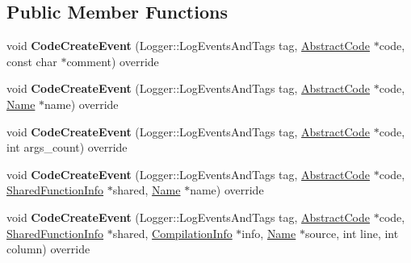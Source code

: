 \subsection*{Public Member Functions}
\begin{DoxyCompactItemize}
\item 
void {\bfseries Code\+Create\+Event} (Logger\+::\+Log\+Events\+And\+Tags tag, \hyperlink{classv8_1_1internal_1_1_abstract_code}{Abstract\+Code} $\ast$code, const char $\ast$comment) override\hypertarget{classv8_1_1internal_1_1_code_event_logger_ac6533a216b4c8f45126d80cec59da31d}{}\label{classv8_1_1internal_1_1_code_event_logger_ac6533a216b4c8f45126d80cec59da31d}

\item 
void {\bfseries Code\+Create\+Event} (Logger\+::\+Log\+Events\+And\+Tags tag, \hyperlink{classv8_1_1internal_1_1_abstract_code}{Abstract\+Code} $\ast$code, \hyperlink{classv8_1_1internal_1_1_name}{Name} $\ast$name) override\hypertarget{classv8_1_1internal_1_1_code_event_logger_a3d4a2166654c7a3b64dc141050dbea47}{}\label{classv8_1_1internal_1_1_code_event_logger_a3d4a2166654c7a3b64dc141050dbea47}

\item 
void {\bfseries Code\+Create\+Event} (Logger\+::\+Log\+Events\+And\+Tags tag, \hyperlink{classv8_1_1internal_1_1_abstract_code}{Abstract\+Code} $\ast$code, int args\+\_\+count) override\hypertarget{classv8_1_1internal_1_1_code_event_logger_a402ccb5bcf1add1d69130b81295366dc}{}\label{classv8_1_1internal_1_1_code_event_logger_a402ccb5bcf1add1d69130b81295366dc}

\item 
void {\bfseries Code\+Create\+Event} (Logger\+::\+Log\+Events\+And\+Tags tag, \hyperlink{classv8_1_1internal_1_1_abstract_code}{Abstract\+Code} $\ast$code, \hyperlink{classv8_1_1internal_1_1_shared_function_info}{Shared\+Function\+Info} $\ast$shared, \hyperlink{classv8_1_1internal_1_1_name}{Name} $\ast$name) override\hypertarget{classv8_1_1internal_1_1_code_event_logger_af70e028af8a6016e51fe1c5c44bbb284}{}\label{classv8_1_1internal_1_1_code_event_logger_af70e028af8a6016e51fe1c5c44bbb284}

\item 
void {\bfseries Code\+Create\+Event} (Logger\+::\+Log\+Events\+And\+Tags tag, \hyperlink{classv8_1_1internal_1_1_abstract_code}{Abstract\+Code} $\ast$code, \hyperlink{classv8_1_1internal_1_1_shared_function_info}{Shared\+Function\+Info} $\ast$shared, \hyperlink{classv8_1_1internal_1_1_compilation_info}{Compilation\+Info} $\ast$info, \hyperlink{classv8_1_1internal_1_1_name}{Name} $\ast$source, int line, int column) override\hypertarget{classv8_1_1internal_1_1_code_event_logger_aaddd9b1adb47ae6bcc1c377058a43509}{}\label{classv8_1_1internal_1_1_code_event_logger_aaddd9b1adb47ae6bcc1c377058a43509}


\end{DoxyCompactItemize}
